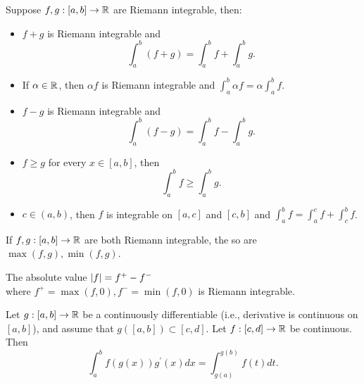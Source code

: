 \documentclass[twoside]{article}
\begin{document}
\begin{theorem}
	Suppose $f, g : [a, b] \to \mathbb{R}$ are Riemann integrable, then:
	\begin{itemize}
		\item $f + g$ is Riemann integrable and
		      \begin{equation*}
			      \int_{a}^{b} (f + g) = \int_{a}^{b} f + \int_{a}^{b} g.
		      \end{equation*}
		\item If $\alpha \in \mathbb{R}$, then $\alpha f$ is Riemann integrable and
		      $\int_{a}^{b} \alpha f = \alpha \int_{a}^{b} f$.
		\item $f - g$ is Riemann integrable and
		      \begin{equation*}
			      \int_{a}^{b} (f - g) = \int_{a}^{b} f - \int_{a}^{b} g.
		      \end{equation*}
		\item $f \geq g$ for every $x \in [a, b]$, then
		      \begin{equation*}
			      \int_{a}^{b} f \geq \int_{a}^{b} g.
		      \end{equation*}
		\item $c \in (a, b)$, then $f$ is integrable on $[a, c]$ and $[c, b]$ and
		      $\int_{a}^{b} f = \int_{a}^{c} f + \int_{c}^{b} f$.
	\end{itemize}
\end{theorem}

\begin{theorem}
	If $f, g : [a, b] \to \mathbb{R}$ are both Riemann integrable, the so are $\max(f, g), \min(f, g)$.
\end{theorem}

\begin{corollary}
	The absolute value $\abs{f} = f^{+} - f^{-}$\\
	where $f^{+} = \max(f, 0), f^{-} = \min(f, 0)$ is Riemann integrable.
\end{corollary}

\begin{theorem}
	Let $g : [a, b] \to \mathbb{R}$ be a continuously differentiable (i.e., derivative is continuous on $[a,b]$),
	and assume that $g([a,b]) \subset [c, d]$. Let $f : [c,d] \to \mathbb{R}$ be continuous. Then
	\begin{equation*}
		\int_{a}^{b} f(g(x))g^{\prime}(x) dx = \int_{g(a)}^{g(b)} f(t) dt.
	\end{equation*}
\end{theorem}
\end{document}
